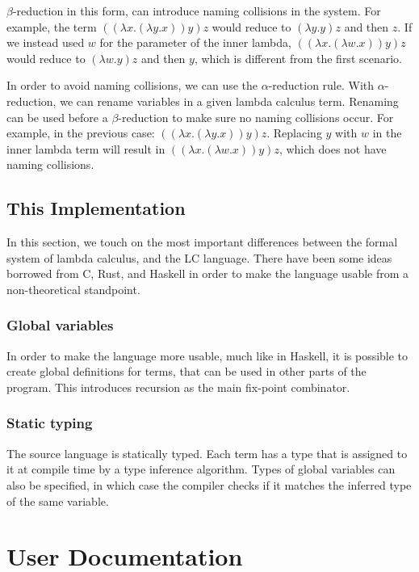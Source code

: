 \documentclass[12pt]{article}
\begin{document}
$\beta$-reduction in this form, can introduce naming collisions in the system.
For example, the term $((\lambda x. (\lambda y. x)) y) z$ would reduce to
$(\lambda y. y) z$ and then $z$. If we instead used $w$ for the parameter of the
inner lambda, $((\lambda x. (\lambda w. x)) y) z$ would reduce to $(\lambda w.
y) z$ and then $y$, which is different from the first scenario.

In order to avoid naming collisions, we can use the $\alpha$-reduction rule.
With $\alpha$-reduction, we can rename variables in a given lambda calculus
term. Renaming can be used before a $\beta$-reduction to make sure no naming
collisions occur. For example, in the previous case: $((\lambda x. (\lambda y.
x)) y) z$. Replacing $y$ with $w$ in the inner lambda term will result in
$((\lambda x. (\lambda w. x)) y) z$, which does not have naming collisions.


\subsection{This Implementation}

In this section, we touch on the most important differences between the formal
system of lambda calculus, and the LC language. There have been some ideas
borrowed from C, Rust, and Haskell in order to make the language usable from a
non-theoretical standpoint.

\subsubsection{Global variables}

In order to make the language more usable, much like in Haskell, it is possible
to create global definitions for terms, that can be used in other parts of the
program. This introduces recursion as the main fix-point combinator.

\subsubsection{Static typing}

The source language is statically typed. Each term has a type that is assigned
to it at compile time by a type inference algorithm. Types of global variables
can also be specified, in which case the compiler checks if it matches the
inferred type of the same variable.

\pagebreak
\section{User Documentation}
\end{document}
